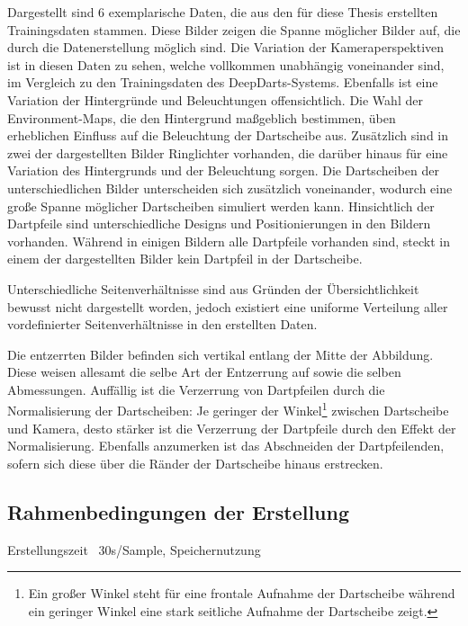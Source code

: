 Dargestellt sind 6 exemplarische Daten, die aus den für diese Thesis erstellten Trainingsdaten stammen. Diese Bilder zeigen die Spanne möglicher Bilder auf, die durch die Datenerstellung möglich sind. Die Variation der Kameraperspektiven ist in diesen Daten zu sehen, welche vollkommen unabhängig voneinander sind, im Vergleich zu den Trainingsdaten des DeepDarts-Systems. Ebenfalls ist eine Variation der Hintergründe und Beleuchtungen offensichtlich. Die Wahl der Environment-Maps, die den Hintergrund maßgeblich bestimmen, üben erheblichen Einfluss auf die Beleuchtung der Dartscheibe aus. Zusätzlich sind in zwei der dargestellten Bilder Ringlichter vorhanden, die darüber hinaus für eine Variation des Hintergrunds und der Beleuchtung sorgen. Die Dartscheiben der unterschiedlichen Bilder unterscheiden sich zusätzlich voneinander, wodurch eine große Spanne möglicher Dartscheiben simuliert werden kann. Hinsichtlich der Dartpfeile sind unterschiedliche Designs und Positionierungen in den Bildern vorhanden. Während in einigen Bildern alle Dartpfeile vorhanden sind, steckt in einem der dargestellten Bilder kein Dartpfeil in der Dartscheibe.

Unterschiedliche Seitenverhältnisse sind aus Gründen der Übersichtlichkeit bewusst nicht dargestellt worden, jedoch existiert eine uniforme Verteilung aller vordefinierter Seitenverhältnisse in den erstellten Daten.

Die entzerrten Bilder befinden sich vertikal entlang der Mitte der Abbildung. Diese weisen allesamt die selbe Art der Entzerrung auf sowie die selben Abmessungen. Auffällig ist die Verzerrung von Dartpfeilen durch die Normalisierung der Dartscheiben: Je geringer der Winkel\footnote{Ein großer Winkel steht für eine frontale Aufnahme der Dartscheibe während ein geringer Winkel eine stark seitliche Aufnahme der Dartscheibe zeigt.} zwischen Dartscheibe und Kamera, desto stärker ist die Verzerrung der Dartpfeile durch den Effekt der Normalisierung. Ebenfalls anzumerken ist das Abschneiden der Dartpfeilenden, sofern sich diese über die Ränder der Dartscheibe hinaus erstrecken.

\subsection{Rahmenbedingungen der Erstellung}  %
\label{sec:render_info}

Erstellungszeit ~30s/Sample, Speichernutzung

\todo{}

